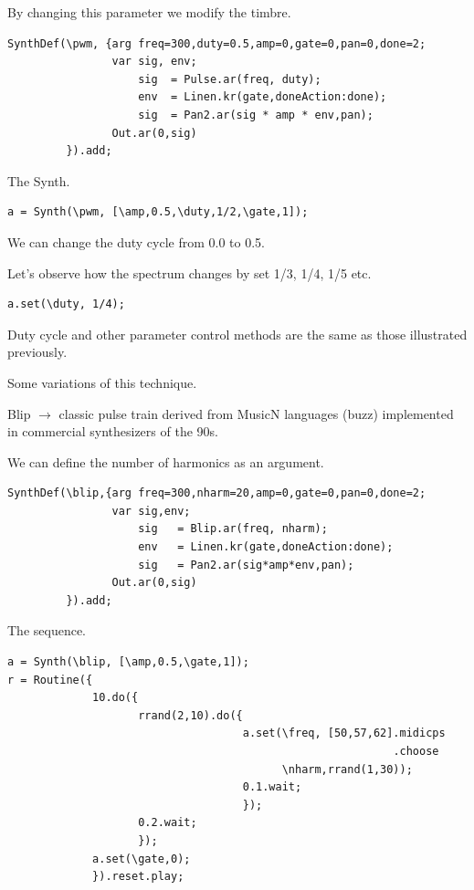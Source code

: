 By changing this parameter we modify the timbre.

\begin{lstlisting}[frame=single, caption=Pulse Width Modulation model] 
SynthDef(\pwm, {arg freq=300,duty=0.5,amp=0,gate=0,pan=0,done=2;
                var sig, env;
                    sig  = Pulse.ar(freq, duty);
                    env  = Linen.kr(gate,doneAction:done);	               
                    sig  = Pan2.ar(sig * amp * env,pan);
                Out.ar(0,sig)
         }).add;
\end{lstlisting}

The Synth.

\begin{lstlisting}[frame=single] 
a = Synth(\pwm, [\amp,0.5,\duty,1/2,\gate,1]);
\end{lstlisting}

We can change the duty cycle from 0.0 to 0.5.

Let's observe how the spectrum changes by set 1/3, 1/4, 1/5 etc.

\begin{lstlisting}[frame=single] 
a.set(\duty, 1/4);
\end{lstlisting}

Duty cycle and other parameter control methods are the same as those illustrated previously.

Some variations of this technique.

Blip \(\rightarrow\) classic pulse train derived from MusicN languages
(buzz) implemented in commercial synthesizers of the 90s.

We can define the number of harmonics as an argument.

\begin{lstlisting}[frame=single, caption=Blip model] 
SynthDef(\blip,{arg freq=300,nharm=20,amp=0,gate=0,pan=0,done=2;
                var sig,env;
                    sig   = Blip.ar(freq, nharm); 
                    env   = Linen.kr(gate,doneAction:done);
                    sig   = Pan2.ar(sig*amp*env,pan);
                Out.ar(0,sig)
         }).add;
\end{lstlisting}

The sequence.

\begin{lstlisting}[frame=single] 
a = Synth(\blip, [\amp,0.5,\gate,1]);                   
r = Routine({
             10.do({
                    rrand(2,10).do({
                                    a.set(\freq, [50,57,62].midicps
                                                           .choose
                                          \nharm,rrand(1,30));
                                    0.1.wait;
                                    });
                    0.2.wait;
                    });
             a.set(\gate,0);
             }).reset.play;
\end{lstlisting}

